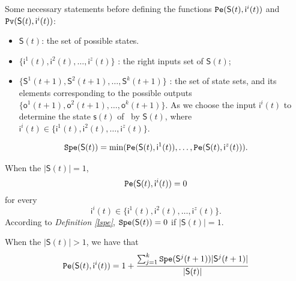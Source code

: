 Some necessary statements before defining the functions ${\tt Pe}(\mathsf{S}(t),\mathsf{ i}^{i}(t))$ and ${\tt Pv}(\mathsf{S}(t),\mathsf{ i}^{i}(t))$:
\begin{itemize}
  \item $\mathsf{S}(t)$: the set of possible states.
  \item $\{\mathsf{ i}^{1}(t),\mathsf{ i}^{2}(t),\ldots, \mathsf{ i}^{z}(t)\}$ : the right inputs set of $\mathsf{S}(t)$;
  \item $\{\mathsf{S}^{1}(t+1),\mathsf{S}^{2}(t+1),\ldots, \mathsf{S}^{k}(t+1)\}$ : the set of state sets, and its elements corresponding to the possible outputs $\{\mathsf{o}^1(t+1),\mathsf{o}^2(t+1),\ldots,\mathsf{o}^k(t+1)\}$. As we choose the input $\mathsf{ i}^{i}(t)$ to determine the state $\mathsf{s}(t)$ of \BCN\ by $\mathsf{S}(t)$, where $\mathsf{ i}^{i}(t) \in \{\mathsf{ i}^{1}(t),\mathsf{ i}^{2}(t),\ldots, \mathsf{ i}^{z}(t)\}$.
\end{itemize} 
\begin{definition} \label{lspe}
\begin{equation}
\begin{split}
{\tt Spe}(\mathsf{S}(t))= \min({\tt Pe}(\mathsf{S}(t), \mathsf{ i}^{1}(t)),\ldots,{\tt Pe}(\mathsf{S}(t), \mathsf{ i}^{z}(t))).
\end{split}
\end{equation}
\end{definition}

\begin{definition} \label{spe}

When the $|\mathsf{S}(t)|=1$,
\[{\tt Pe}(\mathsf{S}(t), \mathsf{ i}^{i}(t))=0\]  for every \[\mathsf{ i}^{i}(t) \in \{\mathsf{ i}^{1}(t),\mathsf{ i}^{2}(t),\ldots, \mathsf{ i}^{z}(t)\}.\] According to {\em Definition \ref{lspe}}, ${\tt Spe}(\mathsf{S}(t))=0$ if $|\mathsf{S}(t)|=1$. 

When the $|\mathsf{S}(t)|>1$, 
we have that  
\begin{equation}
\begin{split}
{\tt Pe}(\mathsf{S}(t), \mathsf{ i}^{i}(t))=1 +\frac{\sum_{j=1}^k {\tt Spe}(\mathsf{S}^{j}(t+1))|\mathsf{S}^{j}(t+1)|}{ |\mathsf{S}(t)|}
\end{split}
\end{equation}
\end{definition}

